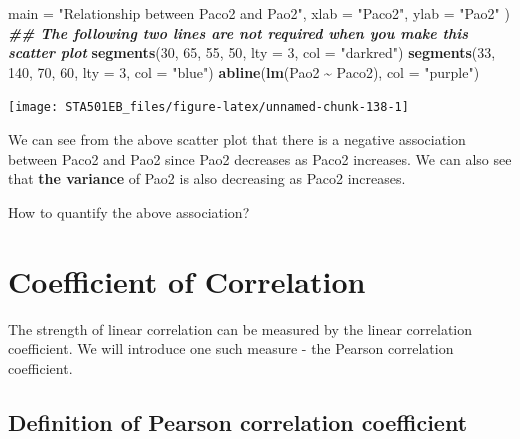 \documentclass[
]{book}
\newenvironment{Shaded}{\begin{snugshade}}{\end{snugshade}}
\newcommand{\AttributeTok}[1]{\textcolor[rgb]{0.13,0.29,0.53}{#1}}
\newcommand{\DecValTok}[1]{\textcolor[rgb]{0.00,0.00,0.81}{#1}}
\newcommand{\DocumentationTok}[1]{\textcolor[rgb]{0.56,0.35,0.01}{\textbf{\textit{#1}}}}
\newcommand{\FunctionTok}[1]{\textcolor[rgb]{0.13,0.29,0.53}{\textbf{#1}}}
\newcommand{\NormalTok}[1]{#1}
\newcommand{\SpecialCharTok}[1]{\textcolor[rgb]{0.81,0.36,0.00}{\textbf{#1}}}
\newcommand{\StringTok}[1]{\textcolor[rgb]{0.31,0.60,0.02}{#1}}
\begin{document}
\begin{Shaded}
\begin{Highlighting}[]
     \AttributeTok{main =} \StringTok{"Relationship between Paco2 and Pao2"}\NormalTok{,}
     \AttributeTok{xlab =} \StringTok{"Paco2"}\NormalTok{,}
     \AttributeTok{ylab =} \StringTok{"Pao2"}
\NormalTok{)}
\DocumentationTok{\#\# The following two lines are not required when you make this scatter plot}
\FunctionTok{segments}\NormalTok{(}\DecValTok{30}\NormalTok{, }\DecValTok{65}\NormalTok{, }\DecValTok{55}\NormalTok{, }\DecValTok{50}\NormalTok{, }\AttributeTok{lty =} \DecValTok{3}\NormalTok{, }\AttributeTok{col =} \StringTok{"darkred"}\NormalTok{)}
\FunctionTok{segments}\NormalTok{(}\DecValTok{33}\NormalTok{, }\DecValTok{140}\NormalTok{, }\DecValTok{70}\NormalTok{, }\DecValTok{60}\NormalTok{, }\AttributeTok{lty =} \DecValTok{3}\NormalTok{, }\AttributeTok{col =} \StringTok{"blue"}\NormalTok{)}
\FunctionTok{abline}\NormalTok{(}\FunctionTok{lm}\NormalTok{(Pao2 }\SpecialCharTok{\textasciitilde{}}\NormalTok{ Paco2), }\AttributeTok{col =} \StringTok{"purple"}\NormalTok{)}
\end{Highlighting}
\end{Shaded}

\begin{center}\texttt{[image: STA501EB\_files/figure-latex/unnamed-chunk-138-1]} \end{center}

We can see from the above scatter plot that there is a negative association between Paco2 and Pao2 since Pao2 decreases as Paco2 increases. We can also see that \textbf{the variance} of Pao2 is also decreasing as Paco2 increases.

How to quantify the above association?

\hypertarget{coefficient-of-correlation}{%
\section{Coefficient of Correlation}\label{coefficient-of-correlation}}

The strength of linear correlation can be measured by the linear correlation coefficient. We will introduce one such measure - the Pearson correlation coefficient.

\hypertarget{definition-of-pearson-correlation-coefficient}{%
\subsection{Definition of Pearson correlation coefficient}\label{definition-of-pearson-correlation-coefficient}}
\end{document}
